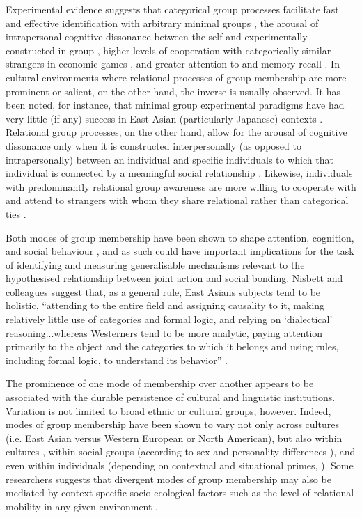 {Experimental evidence suggests that categorical group processes facilitate fast and effective identification with arbitrary minimal groups \citep{Diehl1990,VanBavel2014}, the arousal of intrapersonal cognitive dissonance between the self and experimentally constructed in-group \citep{Festinger1957, Stone2001}, higher levels of cooperation with categorically similar strangers in economic games \citep{Yuki2005,Yuki2003}, and greater attention to and memory recall \citep{Buchan2006,Ng2016}.  In cultural environments where relational processes of group membership are more prominent or salient, on the other hand, the inverse is usually observed. It has been noted, for instance, that minimal group experimental paradigms have had very little (if any) success in East Asian (particularly Japanese) contexts \citep[586]{Liu2009}.  Relational group processes, on the other hand, allow for the arousal of cognitive dissonance only when it is constructed interpersonally (as opposed to intrapersonally) between an individual and specific individuals to which that individual is connected by a meaningful social relationship \citep{Hoshino-Browne2005}.  Likewise, individuals with predominantly relational group awareness are more willing to cooperate with and attend to strangers with whom they share relational rather than categorical ties \citep{Ng2016,Yuki2005}.

Both modes of group membership have been shown to shape attention, cognition, and social behaviour \citep{Nisbett2003}, and as such could have important implications for the task of identifying and measuring generalisable mechanisms relevant to the hypothesised relationship between joint action and social bonding.  Nisbett and colleagues suggest that, as a general rule, East Asians subjects tend to be holistic, ``attending to the entire field and assigning causality to it, making relatively little use of categories and formal logic, and relying on ‘dialectical’ reasoning...whereas Westerners tend to be more analytic, paying attention primarily to the object and the categories to which it belongs and using rules, including formal logic, to understand its behavior'' \citep[291]{Nisbett2001}.

The prominence of one mode of membership over another appears to be
associated with the durable persistence of cultural and linguistic institutions.  Variation is not limited to broad ethnic or cultural groups, however. Indeed, modes of group membership have been shown to vary not only across cultures (i.e. East Asian versus Western European or North American), but also within cultures \citep{Henrich2014}, within social groups (according to sex and personality differences \citep{Yuki2014}), and even within individuals (depending on contextual and situational primes, \citep{Lee2014,Wong2005}). Some researchers suggests that divergent modes of group membership may also be mediated by context-specific socio-ecological factors such as the level of relational mobility in any given environment \citep{Oishi2010,Takagishi2014,Yuki2005}.

}
